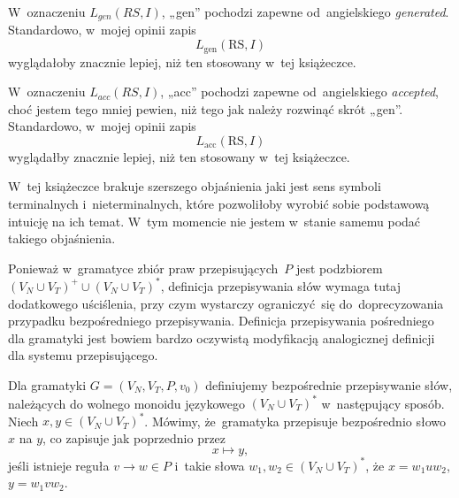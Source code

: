 \documentclass[a4paper,11pt]{article}
\begin{document}
\start {} W~oznaczeniu $L_{ gen }( RS, I )$, „gen” pochodzi zapewne
od~angielskiego \textit{generated}. Standardowo, w~mojej opinii zapis
\begin{equation}
  \label{eq:Forys-Forys-79}
  L_{ \textrm{gen} }( \textrm{RS}, I )
\end{equation}
wyglądałoby znacznie lepiej, niż ten stosowany w~tej książeczce.

\vspace{\spaceFour}





\start {} W~oznaczeniu $L_{ acc }( RS, I )$, „acc” pochodzi zapewne
od~angielskiego \textit{accepted}, choć jestem tego mniej pewien, niż tego
jak należy rozwinąć skrót „gen”. Standardowo, w~mojej opinii zapis
\begin{equation}
  \label{eq:Forys-Forys-80}
  L_{ \textrm{acc} }( \textrm{RS}, I )
\end{equation}
wyglądałby znacznie lepiej, niż ten stosowany w~tej książeczce.

\vspace{\spaceFour}





\start {} W~tej książeczce brakuje szerszego objaśnienia jaki jest
sens symboli terminalnych i~nieterminalnych, które pozwoliłoby wyrobić
sobie podstawową intuicję na ich temat. W~tym momencie nie jestem w~stanie
samemu podać takiego objaśnienia.

\vspace{\spaceFour}





\start {} Ponieważ w~gramatyce zbiór praw przepisujących~$P$ jest
podzbiorem $( V_{ N } \cup V_{ T } )^{ + } \cup ( V_{ N } \cup V_{ T } )^{ * }$,
definicja przepisywania słów wymaga tutaj dodatkowego uściślenia, przy czym
wystarczy ograniczyć~się do~doprecyzowania przypadku bezpośredniego
przepisywania. Definicja przepisywania pośredniego dla gramatyki jest
bowiem bardzo  oczywistą modyfikacją analogicznej definicji dla systemu
przepisującego.

Dla gramatyki $G = ( V_{ N }, V_{ T }, P, v_{ 0 } )$ definiujemy bezpośrednie
przepisywanie słów, należących do wolnego monoidu językowego
$( V_{ N } \cup V_{ T } )^{ * }$ w~następujący sposób. Niech
$x, y \in ( V_{ N } \cup V_{ T } )^{ * }$. Mówimy, że~gramatyka przepisuje
bezpośrednio słowo $x$ na $y$, co zapisuje jak poprzednio przez
\begin{equation}
  \label{eq:Forys-Forys-81}
  x \mapsto y,
\end{equation}
jeśli istnieje reguła $v \to w \in P$ i~takie słowa
$w_{ 1 }, w_{ 2 } \in ( V_{ N } \cup V_{ T } )^{ * }$, że $x = w_{ 1 } u w_{ 2 }$,
$y = w_{ 1 } v w_{ 2 }$.
\end{document}
